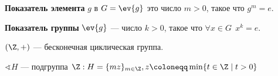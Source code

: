\begin{definition}
    \textbf{Показатель элемента} \(g\) в \(G = \ev{g}\) это число \(m > 0\), такое что \(g^m = e\).
\end{definition}

\begin{definition}
    \textbf{Показатель группы} \(\ev{g}\) --- число \(k > 0\), такое что \(\forall x \in G \ \ x^k = e\).
\end{definition}

\begin{example}
    \((\Z, +)\) --- бесконечная циклическая группа.

    \(\sphericalangle H\) --- подгруппа \(\Z : H = \{mz\}_{m \in \Z}, z \coloneqq \min\{t \in \Z \mid t > 0\}\)
\end{example}
